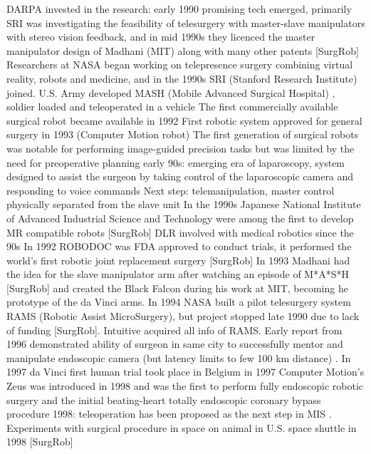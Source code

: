 DARPA invested in the research: early 1990 promising tech emerged, primarily SRI was investigating the feasibility of telesurgery with master-slave manipulators with stereo vision feedback, and in mid 1990s they licenced the master manipulator design of Madhani (MIT) along with many other patents [SurgRob]
Researchers at NASA began working on telepresence surgery combining virtual reality, robots and medicine, and in the 1990s SRI (Stanford Research Institute) joined. \citep{bib:brown_univ}
U.S. Army developed MASH (Mobile Advanced Surgical Hospital) \citep{bib:brown_univ}, soldier loaded and teleoperated in a vehicle
The first commercially available surgical robot became available in 1992\citep{bib:telesurg_history}
First robotic system approved for general surgery in 1993 (Computer Motion robot) \citep{bib:telesurg_history}
The first generation of surgical robots was notable for performing image-guided precision tasks but was limited by the need for preoperative planning
early 90s: emerging era of laparoscopy, system designed to assist the surgeon by taking control of the laparoscopic camera and responding to voice commands
Next step: telemanipulation, master control physically separated from the slave unit
In the 1990s Japanese National Institute of Advanced Industrial Science and Technology were among the first to develop MR compatible robots [SurgRob]
DLR involved with medical robotics since the 90s
In 1992 ROBODOC was FDA approved to conduct trials, it performed the world's first robotic joint replacement surgery [SurgRob]
In 1993 Madhani had the idea for the slave manipulator arm after watching an episode of M*A*S*H [SurgRob] and created the Black Falcon during his work at MIT, becoming he prototype of the da Vinci arms.
In 1994 NASA built a pilot telesurgery system RAMS (Robotic Assist MicroSurgery), but project stopped late 1990 due to lack of funding [SurgRob]. Intuitive acquired all info of RAMS.
Early report from 1996 demonstrated ability of surgeon in same city to successfully mentor and manipulate endoscopic camera (but latency limits to few 100 km distance) \citep{bib:telesurg_history}.
In 1997 da Vinci first human trial took place in Belgium in 1997 \citep{bib:intuitive_monopoly}
Computer Motion's Zeus was introduced in 1998 and was the first to perform fully endoscopic robotic surgery and the initial beating-heart totally endoscopic coronary bypass procedure \citep{bib:brown_univ}
1998: teleoperation has been proposed as the next step in MIS \citep{bib:black_falcon}.
Experiments with surgical procedure in space on animal in U.S. space shuttle in 1998 [SurgRob]
